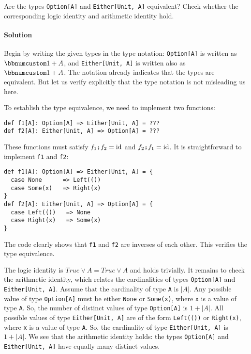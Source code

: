 Are the types \lstinline!Option[A]! and \lstinline!Either[Unit, A]!
equivalent? Check whether the corresponding logic identity and arithmetic
identity hold.

\paragraph{Solution}

Begin by writing the given types in the type notation: \lstinline!Option[A]!
is written as $\bbnum 1+A$, and \lstinline!Either[Unit, A]! is written
also as $\bbnum 1+A$. The notation already indicates that the types
are equivalent. But let us verify explicitly that the type notation
is not misleading us here.

To establish the type equivalence, we need to implement two functions:
\begin{lstlisting}
def f1[A]: Option[A] => Either[Unit, A] = ???
def f2[A]: Either[Unit, A] => Option[A] = ???
\end{lstlisting}
These functions must satisfy $f_{1}\bef f_{2}=\text{id}$ and $f_{2}\bef f_{1}=\text{id}$.
It is straightforward to implement \lstinline!f1! and \lstinline!f2!:
\begin{lstlisting}
def f1[A]: Option[A] => Either[Unit, A] = {
  case None      => Left(())
  case Some(x)   => Right(x)
}
def f2[A]: Either[Unit, A] => Option[A] = {
  case Left(())   => None
  case Right(x)   => Some(x)
}
\end{lstlisting}
The code clearly shows that \lstinline!f1! and \lstinline!f2! are
inverses of each other. This verifies the type equivalence.

The logic identity is $True\vee A=True\vee A$ and holds trivially.
It remains to check the arithmetic identity, which relates the cardinalities
of types \lstinline!Option[A]! and \lstinline!Either[Unit, A]!.
Assume that the cardinality of type \lstinline!A! is $\left|A\right|$.
Any possible value of type \lstinline!Option[A]! must be either \lstinline!None!
or \lstinline!Some(x)!, where \lstinline!x! is a value of type \lstinline!A!.
So, the number of distinct values of type \lstinline!Option[A]! is
$1+\left|A\right|$. All possible values of type \lstinline!Either[Unit, A]!
are of the form \lstinline!Left(())! or \lstinline!Right(x)!, where
\lstinline!x! is a value of type \lstinline!A!. So, the cardinality
of type \lstinline!Either[Unit, A]! is $1+\left|A\right|$. We see
that the arithmetic identity holds: the types \lstinline!Option[A]!
and \lstinline!Either[Unit, A]! have equally many distinct values.


